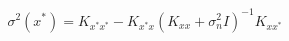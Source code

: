 \documentclass[preview]{standalone}
\begin{document}
\begin{align*}
\sigma^2(x^*) = K_{x^*x^*} - K_{x^*x}\left(K_{xx} + \sigma_n^2 I\right)^{-1}K_{xx^*}
\end{align*}
\end{document}
